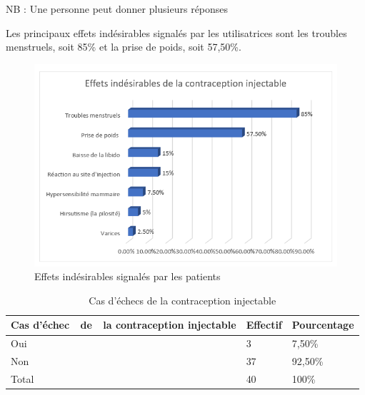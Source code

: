 \noindent NB : Une personne peut donner plusieurs réponses

\vspace{2em}

\noindent Les principaux effets indésirables signalés par les utilisatrices sont les troubles menstruels, soit 85\% et la prise de poids, soit 57,50\%. 

\begin{figure}[H]
  \centering
  \includegraphics[scale=1.15]{Images/fig_54.png}
  \caption{Effets indésirables signalés par les patients}
  
\end{figure}

\begin{table}[H]
  \centering
  \renewcommand{\arraystretch}{1.5}
  \caption{Cas d’échecs de la contraception injectable}
  \begin{spacing}{1.5} %
  \begin{tabularx}{\textwidth}{|p{8cm}|X|X|}
      \hline
      \rowcolor{customcolor}
      \textbf{\color{white}Cas d’échec \,\, de \,\, la contraception \newline injectable} & \textbf{\color{white}Effectif} & \textbf{\color{white}Pourcentage}  \\
      \hline
      Oui & 3 & 7,50\% \\
      \hline
      Non  & 37 & 92,50\% \\
      \hline
      Total & 40 & 100\% \\
      
      \hline
  \end{tabularx}
\end{spacing}

\end{table}

